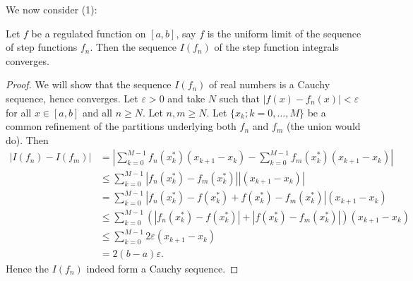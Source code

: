 \documentclass[10pt, a4paper]{article}
\begin{document}
We now consider (1):
\begin{lemma}
    Let $f$ be a regulated function on $[a, b]$,
    say $f$ is the uniform limit of the sequence of step functions $f_n$.
    Then the sequence $I(f_n)$ of the step function integrals converges.

    \begin{proof}
        We will show that the sequence $I(f_n)$ of real numbers is a Cauchy sequence,
        hence converges.
        Let $\varepsilon > 0$ and take $N$ such that $|f(x) - f_n(x)| < \varepsilon$ for all $x \in [a, b]$ and all $n \geq N$.
        Let $n, m \geq N$.
        Let $\{x_k; k = 0, \dotsc, M\}$ be a common refinement of the partitions underlying both $f_n$ and $f_m$
        (the union would do).
        Then
        \begin{align*}
            |I(f_n) - I(f_m)| &= \left|\sum_{k = 0}^{M - 1}f_n(x_k ^ {*})(x_{k + 1} - x_k) - \sum_{k = 0}^{M - 1}f_m(x_k ^ {*})(x_{k + 1} - x_k)\right| \\
            &\leq \sum_{k = 0}^{M - 1}|f_n(x_k ^ {*}) - f_m(x_k ^ {*})||(x_{k + 1} - x_k)| \\
            &= \sum_{k = 0}^{M - 1}|f_n(x_k ^ {*}) - f(x_k ^ {*}) + f(x_k ^ {*}) - f_m(x_k ^ {*})|(x_{k + 1} - x_k) \\
            &\leq \sum_{k = 0}^{M - 1}(|f_n(x_k ^ {*}) - f(x_k ^ {*})| + |f(x_k ^ {*}) - f_m(x_k ^ {*})|)(x_{k + 1} - x_k) \\
            &\leq \sum_{k = 0}^{M - 1}2\varepsilon(x_{k + 1} - x_k) \\
            &= 2(b - a)\varepsilon.
        \end{align*}
        Hence the $I(f_n)$ indeed form a Cauchy sequence.
    \end{proof}
\end{lemma}
\end{document}
